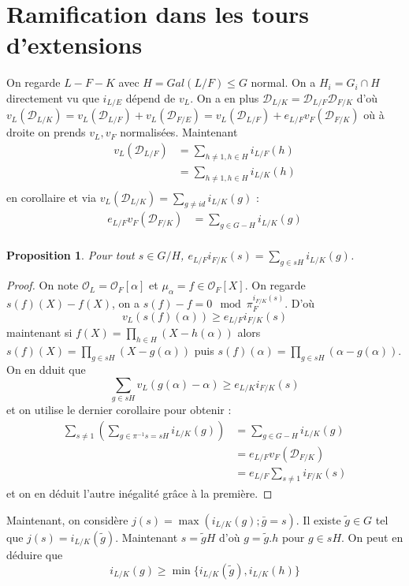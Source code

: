 \documentclass[a4paper,12pt]{book}
\newcommand{\Or}{\mathcal{O}}
\newcommand{\D}{\mathscr{D}}
\theoremstyle{plain}
\newtheorem{prop}{Proposition}
\theoremstyle{definition}
\theoremstyle{remark}
\begin{document}
\section{Ramification dans les tours d'extensions}
On regarde $L-F-K$ avec $H=Gal(L/F)\leq G$ normal. On a 
$H_i=G_i\cap H$ directement vu que $i_{L/E}$ dépend de $v_L$.
On a en plus $\D_{L/K}=\D_{L/F}\D_{F/K}$ d'où $v_L(\D_{L/K})=v_L(
\D_{L/F})+v_L(\D_{F/E})=v_L(\D_{L/F})+e_{L/F}v_F(\D_{F/K})$
où à droite on prends $v_L,v_F$ normalisées. Maintenant
\begin{align*}
    v_L(\D_{L/F})&=\sum_{h\ne 1,h\in H}i_{L/F}(h)\\
                 &=\sum_{h\ne 1,h\in H} i_{L/K}(h)\\
\end{align*}
en corollaire et via $v_L(\D_{L/K})=\sum_{g\ne id} i_{L/K}(g)$ :
\begin{align*}
    e_{L/F}v_F(\D_{F/K})&=\sum_{g\in G-H}i_{L/K}(g)\\
\end{align*}
\begin{prop}
    Pour tout $s\in G/H$, $e_{L/F}i_{F/K}(s)=\sum_{g\in sH} i_{L/K}(g)$.
\end{prop}
\begin{proof}
    On note $\Or_L=\Or_F[\alpha]$ et $\mu_\alpha=f\in\Or_F[X]$.
    On regarde $s(f)(X)-f(X)$, on a 
    $s(f)-f=0\mod \pi_F^{i_{F/K}(s)}$. D'où 
    \[v_L(s(f)(\alpha))\geq e_{L/F}i_{F/K}(s)\]
    maintenant si $f(X)=\prod_{h\in H}(X-h(\alpha))$ alors
    $s(f)(X)=\prod_{g\in sH}(X-g(\alpha))$ puis 
    $s(f)(\alpha)=\prod_{g\in sH}(\alpha-g(\alpha))$. On en dduit
    que 
    \[\sum_{g\in sH}v_L(g(\alpha)-\alpha)\geq e_{L/K}i_{F/K}(s)\]
    et on utilise le dernier corollaire pour obtenir :
    \begin{align*}
        \sum_{s\ne 1}(\sum_{g\in\pi^{-1}s=sH}i_{L/K}(g))&=\sum_{g\in G-H} i_{L/K}(g)\\
                                                        &=e_{L/F}v_F(\D_{F/K})\\
                                                        &=e_{L/F}\sum_{s\ne 1}i_{F/K}(s)
    \end{align*}
    et on en déduit l'autre inégalité grâce à la première.
\end{proof}
Maintenant, on considère $j(s)=\max(i_{L/K}(g);\bar g=s)$.
Il existe $\tilde g\in G$ tel que $j(s)=i_{L/K}(\tilde g)$.
Maintenant $s=\tilde gH$ d'où $g=\tilde g.h$ pour $g\in sH$. 
On peut en déduire que
\[i_{L/K}(g)\geq \min\{i_{L/K}(\tilde g),i_{L/K}(h)\}\]
\end{document}
